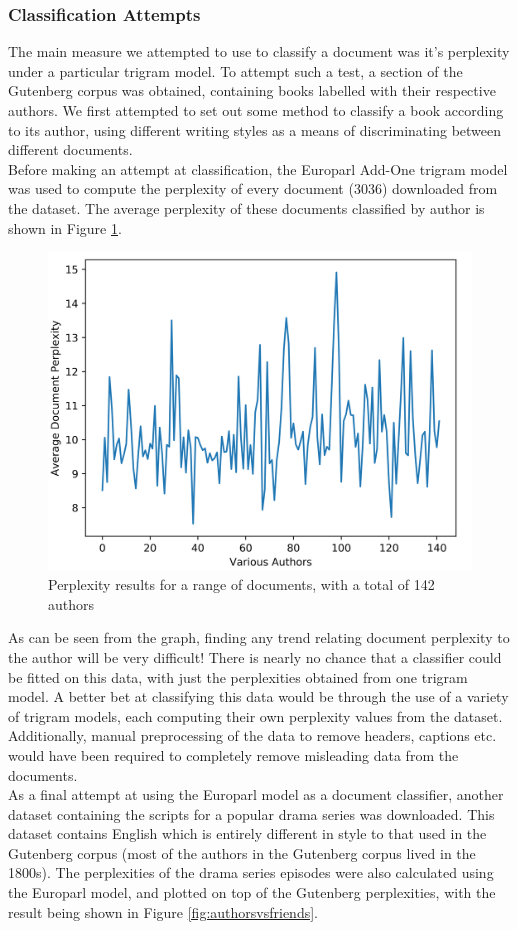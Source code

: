 \documentclass[12pt]{article}
\begin{document}
\subsubsection{Classification Attempts}
The main measure we attempted to use to classify a document was it's perplexity under a particular trigram model.  To attempt such a test, a section of the Gutenberg \cite{Gutenberg} corpus was obtained, containing books labelled with their respective authors.  We first attempted to set out some method to classify a book according to its author, using different writing styles as a means of discriminating between different documents.\\
\hfill\break  
Before making an attempt at classification, the Europarl Add-One trigram model was used to compute the perplexity of every document (3036) downloaded from the dataset.  The average perplexity of these documents classified by author is shown in Figure \ref{fig:authorsper}.
\begin{figure}[H]
	\centering
	\includegraphics[width=0.8\linewidth]{graphics/authors_per}
	\caption{Perplexity results for a range of documents, with a total of 142 authors}
	\label{fig:authorsper}
\end{figure}
As can be seen from the graph, finding any trend relating document perplexity to the author will be very difficult!  There is nearly no chance that a classifier could be fitted on this data, with just the perplexities obtained from one trigram model.  A better bet at classifying this data would be through the use of a variety of trigram models, each computing their own perplexity values from the dataset.  Additionally, manual preprocessing of the data to remove headers, captions etc. would have been required to completely remove misleading data from the documents.\\
\hfill\break
As a final attempt at using the Europarl model as a document classifier, another dataset \cite{friends} containing the scripts for a popular drama series was downloaded.  This dataset contains English which is entirely different in style to that used in the Gutenberg corpus (most of the authors in the Gutenberg corpus lived in the 1800s).  The perplexities of the drama series episodes were also calculated using the Europarl model, and plotted on top of the Gutenberg perplexities, with the result being shown in Figure \ref{fig:authorsvsfriends}.
\end{document}
